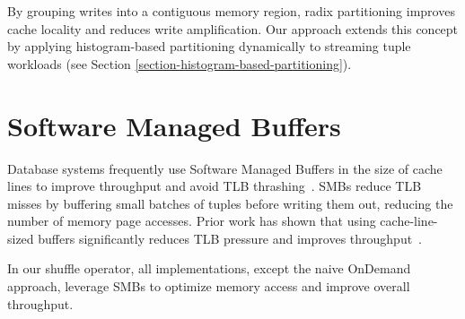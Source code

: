By grouping writes into a contiguous memory region, radix partitioning improves cache locality and reduces write amplification.
Our approach extends this concept by applying histogram-based partitioning dynamically to streaming tuple workloads (see Section \ref{section-histogram-based-partitioning}).

\section{Software Managed Buffers}\label{sec-rw-smb}
Database systems frequently use Software Managed Buffers in the size of cache lines to improve throughput and avoid \ac{TLB} thrashing~\parencite{db-buffer-management, smb-join, smb-partitioning-sort}.
SMBs reduce \ac{TLB} misses by buffering small batches of tuples before writing them out, reducing the number of memory page accesses.
Prior work has shown that using cache-line-sized buffers significantly reduces TLB pressure and improves throughput~\parencite{what-every-programmer-should-know-about-memory}.

In our shuffle operator, all implementations, except the naive OnDemand approach, leverage SMBs to optimize memory access and improve overall throughput.
